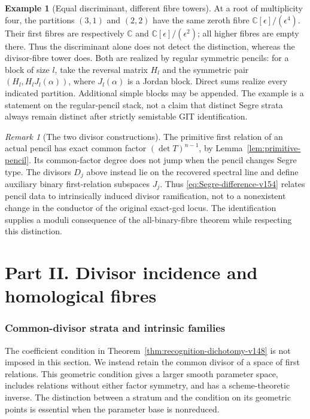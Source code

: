 \documentclass[11pt,reqno]{amsart}
\numberwithin{equation}{section}
\theoremstyle{definition}\newtheorem{definition}[theorem]{Definition}
\newtheorem{example}[theorem]{Example}
\theoremstyle{remark}\newtheorem{remark}[theorem]{Remark}
\newcommand{\C}{\mathbb C}\newcommand{\Q}{\mathbb Q}
\begin{document}
\begin{example}[Equal discriminant, different fibre towers]
\label{ex:segre-fibres-v154}
At a root of multiplicity four, the partitions $(3,1)$ and $(2,2)$
have the same zeroth fibre $\C[\epsilon]/(\epsilon^4)$.
Their first fibres are respectively $\C$ and
$\C[\epsilon]/(\epsilon^2)$; all higher fibres are empty there.
Thus the discriminant alone does not detect the distinction, whereas
the divisor-fibre tower does. Both are realized by regular symmetric
pencils: for a block of size $l$, take the reversal matrix $H_l$ and
the symmetric pair $(H_l,H_lJ_l(\alpha))$, where $J_l(\alpha)$ is
a Jordan block. Direct sums realize every indicated partition.
Additional simple blocks may be appended. The example is a statement
on the regular-pencil stack, not a claim that distinct Segre strata
always remain distinct after strictly semistable GIT identification.
\end{example}

\begin{remark}[The two divisor constructions]\label{rem:two-divisors-v154}
The primitive first relation of an actual pencil has exact common
factor $(\det T)^{n-1}$, by Lemma~\ref{lem:primitive-pencil}.
Its common-factor degree does not jump when the pencil changes
Segre type. The divisors $D_j$ above instead lie on the recovered
spectral line and define auxiliary binary first-relation subspaces
$J_j$. Thus \eqref{eq:Segre-difference-v154} relates pencil data to
intrinsically induced divisor ramification, not to a nonexistent
change in the conductor of the original exact-gcd locus. The
identification supplies a moduli consequence of the all-binary-fibre
theorem while respecting this distinction.
\end{remark}

\part*{Part II. Divisor incidence and homological fibres}

\section{Common-divisor strata and intrinsic families}
\label{sec:common-divisor-strata}

The coefficient condition in Theorem~\ref{thm:recognition-dichotomy-v148}
is not imposed in this section.  We instead retain the common divisor
of a space of first relations.  This geometric condition gives a
larger smooth parameter space, includes relations without either
factor symmetry, and has a scheme-theoretic inverse.  The distinction
between a stratum and the condition on its geometric points is
essential when the parameter base is nonreduced.
\end{document}
